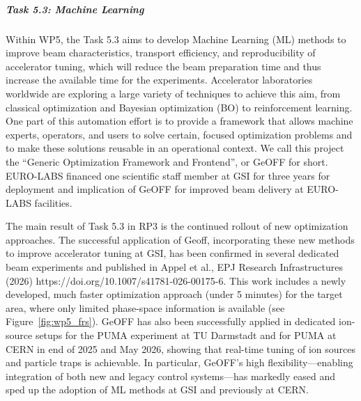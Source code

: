 \subparagraph{Task 5.3: Machine Learning} \mbox{} 


Within WP5, the Task 5.3 aims to develop Machine Learning (ML) methods to improve beam characteristics, transport efficiency, and reproducibility of accelerator tuning, which will reduce the beam preparation time and thus increase the available time for the experiments. Accelerator laboratories worldwide are exploring a large variety of techniques to achieve this aim, from classical optimization and Bayesian optimization (BO) to reinforcement learning. One part of this automation effort is to provide a framework that allows machine experts, operators, and users to solve certain, focused optimization problems and to make these solutions reusable in an operational context. We call this project the “Generic Optimization Framework and Frontend”, or GeOFF for short.  EURO-LABS financed one scientific staff member at GSI for three years for deployment and implication of GeOFF for improved beam delivery at EURO-LABS facilities.

The main result of Task 5.3 in RP3 is the continued rollout of new optimization approaches. The successful application of Geoff, incorporating these new methods to improve accelerator tuning at GSI, has been confirmed in several dedicated beam experiments and published in Appel et al., EPJ Research Infrastructures (2026) https://doi.org/10.1007/s41781-026-00175-6. This work includes a newly developed, much faster optimization approach (under 5 minutes) for the target area, where only limited phase-space information is available (see Figure~\ref{fig:wp5_frs}). GeOFF has also been successfully applied in dedicated ion-source setups for the PUMA experiment at TU Darmstadt and for PUMA at CERN in end of 2025 and May 2026, showing that real-time tuning of ion sources and particle traps is achievable. In particular, GeOFF’s high flexibility—enabling integration of both new and legacy control systems—has markedly eased and sped up the adoption of ML methods at GSI and previously at CERN.

